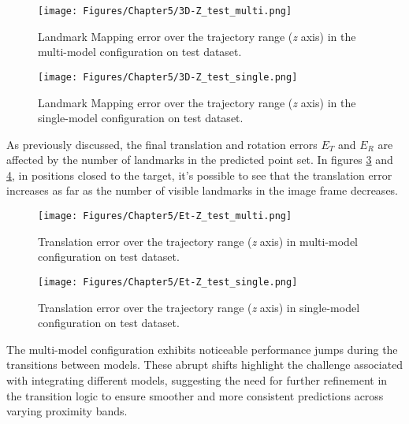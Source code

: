 \begin{figure}[H]
    \centering
    \texttt{[image: Figures/Chapter5/3D-Z\_test\_multi.png]}
    \caption[Landmark Mapping error over the trajectory range in the multi-model configuration on test dataset.]{Landmark Mapping error over the trajectory range (\textit{z} axis) in the multi-model configuration on test dataset.}
    \label{fig:3D-Z test multi}
\end{figure}
\begin{figure}[H]
    \centering
    \texttt{[image: Figures/Chapter5/3D-Z\_test\_single.png]}
    \caption[Landmark Mapping error over the trajectory range in the single-model configuration on test dataset.]{Landmark Mapping error over the trajectory range (\textit{z} axis) in the single-model configuration on test dataset.}
    \label{fig:3D-Z test single}
\end{figure}
\newpage

As previously discussed, the final translation and rotation errors $E_T$ and $E_R$ are affected by the number of landmarks in the predicted point set. In figures \ref{fig:Et test multi} and \ref{fig:Et test single}, in positions closed to the target, it's possible to see that the translation error increases as far as the number of visible landmarks in the image frame decreases.\\

\begin{figure}[H]
    \centering
    \texttt{[image: Figures/Chapter5/Et-Z\_test\_multi.png]}
    \caption[Translation error over the trajectory range in multi-model configuration on test dataset.]{Translation error over the trajectory range (\textit{z} axis) in multi-model configuration on test dataset.}
    \label{fig:Et test multi}
\end{figure}
\begin{figure}[H]
    \centering
    \texttt{[image: Figures/Chapter5/Et-Z\_test\_single.png]}
    \caption[Translation error over the trajectory range in single-model configuration on test dataset.]{Translation error over the trajectory range (\textit{z} axis) in single-model configuration on test dataset.}
    \label{fig:Et test single}
\end{figure}

\newpage
The multi-model configuration exhibits noticeable performance jumps during the transitions between models. These abrupt shifts highlight the challenge associated with integrating different models, suggesting the need for further refinement in the transition logic to ensure smoother and more consistent predictions across varying proximity bands.

